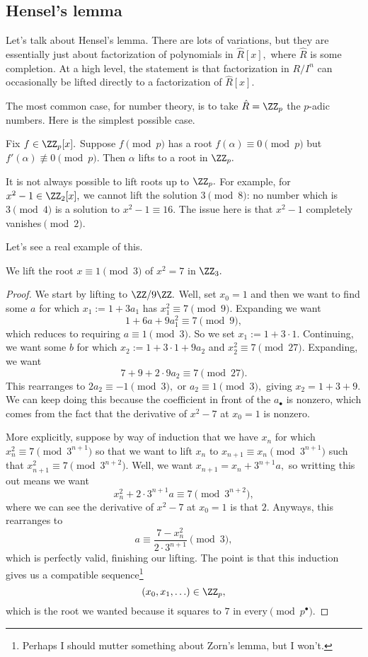 \subsection{Hensel's lemma}
Let's talk about {Hensel}'s lemma. There are lots of variations, but they are essentially just about factorization of polynomials in $\hat R[x],$ where $\hat R$ is some completion. At a high level, the statement is that factorization in $R/I^n$ can occasionally be lifted directly to a factorization of $\hat R[x].$

The most common case, for number theory, is to take $\hat R=\ZZ_p$ the $p$-adic numbers. Here is the simplest possible case.
\begin{theorem}[Hensel] \label{thm:hensel1}
	Fix $f\in\ZZ_p[x].$ Suppose $f\pmod p$ has a root $f(\alpha)\equiv0\pmod p$ but $f'(\alpha)\not\equiv0\pmod p.$ Then $\alpha$ lifts to a root in $\ZZ_p.$
\end{theorem}
\begin{nex}
	It is not always possible to lift roots up to $\ZZ_p.$ For example, for $x^2-1\in\ZZ_2[x],$ we cannot lift the solution $3\pmod8$: no number which is $3\pmod4$ is a solution to $x^2-1\equiv{16}.$ The issue here is that $x^2-1$ completely vanishes$\pmod2.$
\end{nex}
Let's see a real example of this.
\begin{exercise}
	We lift the root $x\equiv1\pmod3$ of $x^2=7$ in $\ZZ_3.$
\end{exercise}
\begin{proof}
	We start by lifting to $\ZZ/9\ZZ.$ Well, set $x_0=1$ and then we want to find some $a$ for which $x_1:=1+3a_1$ has $x_1^2\equiv7\pmod9.$ Expanding we want
	\[1+6a+9a_1^2\equiv7\pmod9,\]
	which reduces to requiring $a\equiv1\pmod3.$ So we set $x_1:=1+3\cdot1.$ Continuing, we want some $b$ for which $x_2:=1+3\cdot1+9a_2$ and $x_2^2\equiv7\pmod{27}.$ Expanding, we want
	\[7+9+2\cdot9a_2\equiv7\pmod{27}.\]
	This rearranges to $2a_2\equiv-1\pmod3,$ or $a_2\equiv1\pmod3,$ giving $x_2=1+3+9.$ We can keep doing this because the coefficient in front of the $a_\bullet$ is nonzero, which comes from the fact that the derivative of $x^2-7$ at $x_0=1$ is nonzero.

	More explicitly, suppose by way of induction that we have $x_n$ for which $x_n^2\equiv7\pmod{3^{n+1}}$ so that we want to lift $x_n$ to $x_{n+1}\equiv x_n\pmod{3^{n+1}}$ such that $x_{n+1}^2\equiv7\pmod{3^{n+2}}.$ Well, we want $x_{n+1}=x_n+3^{n+1}a,$ so writting this out means we want
	\[x_n^2+2\cdot3^{n+1}a\equiv7\pmod{3^{n+2}},\]
	where we can see the derivative of $x^2-7$ at $x_0=1$ is that $2.$ Anyways, this rearranges to
	\[a\equiv\frac{7-x_n^2}{2\cdot3^{n+1}}\pmod3,\]
	which is perfectly valid, finishing our lifting. The point is that this induction gives us a compatible sequence\footnote{Perhaps I should mutter something about Zorn's lemma, but I won't.}
	\[(x_0,x_1,\ldots)\in\ZZ_p,\]
	which is the root we wanted because it squares to $7$ in every$\pmod{p^\bullet}.$
\end{proof}
